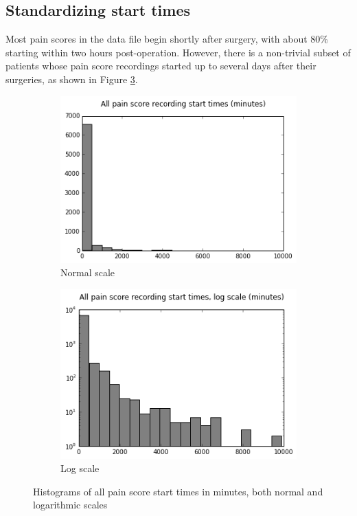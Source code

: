 \subsection{Standardizing start times}
Most pain scores in the data file begin shortly after surgery, with about 80\% starting within two hours post-operation. However, there is a non-trivial subset of patients whose pain score recordings started up to several days after their surgeries, as shown in Figure \ref{fig:start_times}.

\begin{figure}[h]
        \begin{subfigure}{0.5\textwidth}
                \includegraphics[width=\textwidth]{Figures/pain_score_start_times.png}
                \caption{Normal scale}
                \label{fig:start_times_normal}
        \end{subfigure}\begin{subfigure}{0.5\textwidth}
                \includegraphics[width=\textwidth]{Figures/pain_score_start_times_log.png}
                \caption{Log scale}
                \label{fig:start_times_log}
        \end{subfigure}
        \caption{Histograms of all pain score start times in minutes, both normal and logarithmic scales}\label{fig:start_times}
\end{figure}

